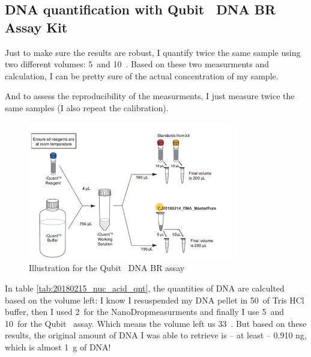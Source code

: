 \subsection{DNA quantification with Qubit\texttrademark~ DNA BR Assay Kit}
\label{task:20180215_cj1}

Just to make sure the results are robust, I quantify twice the same sample using two different volumes: 5~\uL and 10~\uL. Based on these two measurments and calculation, I can be pretty sure of the actual concentration of my sample. 

And to assess the reproducibility of the measurments, I just measure twice the same samples (I also repeat the calibration).

\begin{figure}[H] %
    \centering
    \caption{Illustration for the Qubit\texttrademark~ DNA BR assay}
    \label{fig:20180215_Qubit_dsDNA_BR}
    \includegraphics[width=0.8\textwidth]{graphics/schemas/20180215_Qubit_dsDNA_BR.png}
\end{figure}

In table \ref{tab:20180215_nuc_acid_qnt}, the quantities of DNA are calculted based on the volume left: I know I resuspended my DNA pellet in 50~\uL of Tris HCl buffer, then I used 2~\uL for the NanoDrop\cR measurments and finally I use 5~\uL and 10~\uL for the Qubit\texttrademark~ assay. Which means the volume left us 33~\uL. But based on these results, the original amount of DNA I was able to retrieve is -- at least -- 0.910 ng, which is almost 1~\textmu g of DNA!

